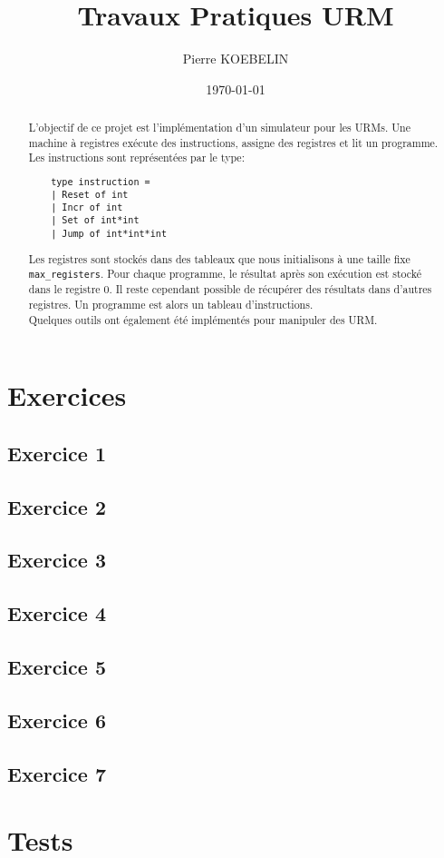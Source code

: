 \documentclass[11pt, a4paper, twoside, titlepage]{article}
\begin{document}
\title{{\titlefont Travaux Pratiques URM}}
\author{Pierre KOEBELIN}
\date{\today}
\maketitle

\begin{abstract}
	L'objectif de ce projet est l'implémentation d'un simulateur pour les URMs. Une machine à registres exécute des instructions, assigne des registres et lit un programme. Les instructions sont représentées par le type:
\begin{lstlisting}
	type instruction =
	| Reset of int
	| Incr of int
	| Set of int*int
	| Jump of int*int*int
\end{lstlisting}
	Les registres sont stockés dans des tableaux que nous initialisons à une taille fixe \texttt{max\_registers}. Pour chaque programme, le résultat après son exécution est stocké dans le registre 0. Il reste cependant possible de récupérer des résultats dans d'autres registres. Un programme est alors un tableau d’instructions.\\
	Quelques outils ont également été implémentés pour manipuler des URM.
\end{abstract}

\tableofcontents

\newpage
\section{Exercices}

\subsection{Exercice 1}

\subsection{Exercice 2}

\subsection{Exercice 3}

\subsection{Exercice 4}

\subsection{Exercice 5}

\subsection{Exercice 6}

\subsection{Exercice 7}

\section{Tests}
\end{document}
